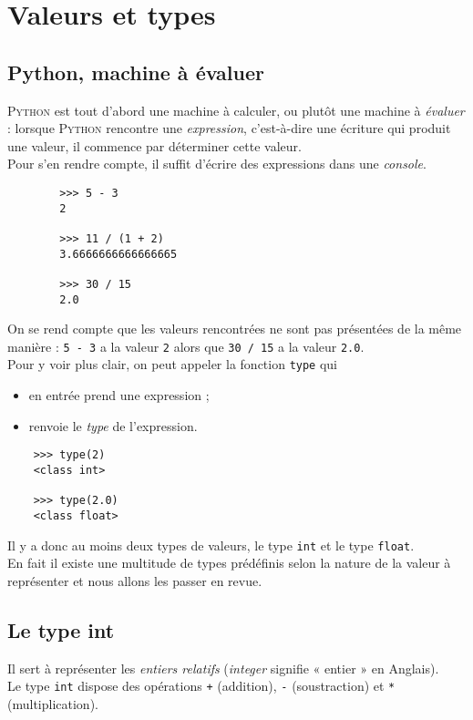 \chapter{Valeurs et types}
\section{Python, machine à évaluer}
\textsc{Python} est tout d'abord une machine à calculer, ou plutôt une machine à \textit{évaluer} : lorsque \textsc{Python} rencontre une \textit{expression}, c'est-à-dire une écriture qui produit une valeur, il commence par déterminer cette valeur.\\
Pour s'en rendre compte, il suffit d'écrire des expressions dans une \textit{console}.
\begin{pyc}
    \begin{verbatim}
        >>> 5 - 3
        2
        
        >>> 11 / (1 + 2)
        3.6666666666666665

        >>> 30 / 15
        2.0
    \end{verbatim}
\end{pyc}
On se rend compte que les valeurs rencontrées ne sont pas présentées de la même manière : \texttt{5 - 3} a la valeur \texttt{2} alors que \texttt{30 / 15} a la valeur \texttt{2.0}.\\
Pour y voir plus clair, on peut appeler la fonction \texttt{type} qui 
\begin{itemize}
  \item en entrée prend une expression ;
  \item renvoie le \textit{type} de l'expression.
\end{itemize}
\begin{pyc}
  \begin{verbatim}
    >>> type(2)
    <class int>

    >>> type(2.0)
    <class float>
  \end{verbatim}
\end{pyc}

Il y a donc au moins deux types de valeurs, le type \texttt{int} et le type \texttt{float}.\\
En fait il existe une multitude de types prédéfinis selon la nature de la valeur à représenter et nous allons les passer en revue.


\section{Le type int}
Il sert à représenter les \textit{entiers relatifs} (\textit{integer} signifie  « entier » en Anglais).\\
Le type \texttt{int} dispose des opérations \texttt{+} (addition), \texttt{-} (soustraction) et \texttt{*} (multiplication).

